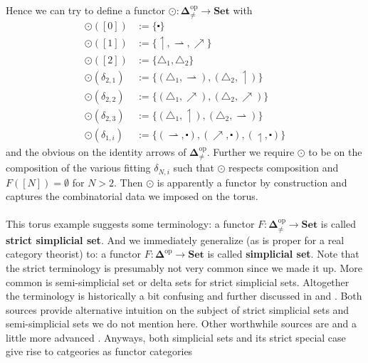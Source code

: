 Hence we can try to define a functor $\odot \colon \mathbf{\Delta}_{\neq}^{\mathrm{op}} \rightarrow \mathbf{Set}$ with
\begin{align*}
  \odot([0])
  &:=
  \lbrace
    \centerdot
  \rbrace
  \\
  \odot([1])
  &:=
  \lbrace
    \upharpoonleft,
    \rightharpoonup,
    \nearrow
  \rbrace
  \\
  \odot([2])
  &:=
  \lbrace
    \triangle_{1},
    \triangle_{2}
  \rbrace
  \\
  \odot(\delta_{2,1})
  &:=
  \lbrace
    (\triangle_{1},\rightharpoonup),
    (\triangle_{2},\upharpoonleft)
  \rbrace
  \\
  \odot(\delta_{2,2})
  &:=
  \lbrace
    (\triangle_{1},\nearrow),
    (\triangle_{2},\nearrow)
  \rbrace
  \\
  \odot(\delta_{2,3})
  &:=
  \lbrace
    (\triangle_{1},\upharpoonleft),
    (\triangle_{2},\rightharpoonup)
  \rbrace
  \\
  \odot(\delta_{1,i})
  &:=
  \lbrace
    (\rightharpoonup,\centerdot),
    (\nearrow,\centerdot),
    (\upharpoonleft,\centerdot)
  \rbrace
\end{align*}
and the obvious on the identity arrows of $\mathbf{\Delta}_{\neq}^{\mathrm{op}}$. Further we require $\odot$ to be on the composition of the various fitting $\delta_{N,i}$ such that $\odot$ respects composition and $F([N]) = \emptyset$ for $N > 2$. Then $\odot$ is apparently a functor by construction and captures the combinatorial data we imposed on the torus.
\\\\
This torus example suggests some terminology: a functor $F \colon \mathbf{\Delta}_{\neq}^{\mathrm{op}} \rightarrow \mathbf{Set}$ is called \textbf{strict simplicial set}. And we immediately generalize (as is proper for a real category theorist) to: a functor $F \colon \mathbf{\Delta}^{\mathrm{op}} \rightarrow \mathbf{Set}$ is called \textbf{simplicial set}. Note that the {\glqq}strict{\grqq} terminology is presumably not very common since we made it up. More common is semi-simplicial set or delta sets for strict simplicial sets. Altogether the terminology is historically a bit confusing and further discussed in \cite{8b5861fc} and \cite{4dd1b85f}. Both sources provide alternative intuition on the subject of strict simplicial sets and semi-simplicial sets we do not mention here. Other worthwhile sources are \cite{d09756a3} and a little more advanced \cite{b28b8d8f}. Anyways, both simplicial sets and its strict special case give rise to catgeories as functor categories
